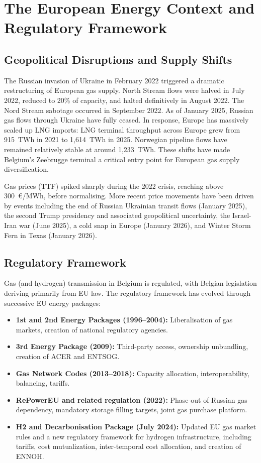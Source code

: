 \section{The European Energy Context and Regulatory Framework}

\subsection{Geopolitical Disruptions and Supply Shifts}

The Russian invasion of Ukraine in February 2022 triggered a dramatic restructuring of European gas supply. North Stream flows were halved in July 2022, reduced to 20\% of capacity, and halted definitively in August 2022. The Nord Stream sabotage occurred in September 2022. As of January 2025, Russian gas flows through Ukraine have fully ceased. In response, Europe has massively scaled up LNG imports: LNG terminal throughput across Europe grew from 915~TWh in 2021 to 1,614~TWh in 2025. Norwegian pipeline flows have remained relatively stable at around 1,233~TWh. These shifts have made Belgium's Zeebrugge terminal a critical entry point for European gas supply diversification.

Gas prices (TTF) spiked sharply during the 2022 crisis, reaching above 300~€/MWh, before normalising. More recent price movements have been driven by events including the end of Russian Ukrainian transit flows (January 2025), the second Trump presidency and associated geopolitical uncertainty, the Israel-Iran war (June 2025), a cold snap in Europe (January 2026), and Winter Storm Fern in Texas (January 2026).

\subsection{Regulatory Framework}

Gas (and hydrogen) transmission in Belgium is regulated, with Belgian legislation deriving primarily from EU law. The regulatory framework has evolved through successive EU energy packages:

\begin{itemize}[noitemsep]
    \item \textbf{1st and 2nd Energy Packages (1996--2004):} Liberalisation of gas markets, creation of national regulatory agencies.
    \item \textbf{3rd Energy Package (2009):} Third-party access, ownership unbundling, creation of ACER and ENTSOG.
    \item \textbf{Gas Network Codes (2013--2018):} Capacity allocation, interoperability, balancing, tariffs.
    \item \textbf{RePowerEU and related regulation (2022):} Phase-out of Russian gas dependency, mandatory storage filling targets, joint gas purchase platform.
    \item \textbf{H2 and Decarbonisation Package (July 2024):} Updated EU gas market rules and a new regulatory framework for hydrogen infrastructure, including tariffs, cost mutualization, inter-temporal cost allocation, and creation of ENNOH.
\end{itemize}

